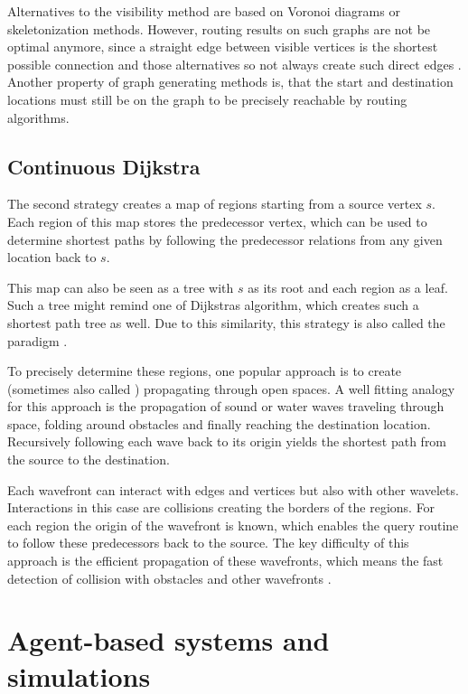 		Alternatives to the visibility method are based on Voronoi diagrams or skeletonization methods.
		However, routing results on such graphs are not be optimal anymore, since a straight edge between visible vertices is the shortest possible connection and those alternatives so not always create such direct edges \cite{graser-osm-open-spaces}.
		Another property of graph generating methods is, that the start and destination locations must still be on the graph to be precisely reachable by routing algorithms.
	
	\subsection{Continuous Dijkstra}
	\label{subsec:continuous-dijkstra}
	
		The second strategy creates a map of regions starting from a source vertex $s$.
		Each region of this map stores the predecessor vertex, which can be used to determine shortest paths by following the predecessor relations from any given location back to $s$.

		This map can also be seen as a tree with $s$ as its root and each region as a leaf.
		Such a tree might remind one of Dijkstras algorithm, which creates such a shortest path tree as well.
		Due to this similarity, this strategy is also called the  paradigm \cite{mitchell-discrete-geodesic}.
		
		To precisely determine these regions, one popular approach is to create  (sometimes also called ) propagating through open spaces.
		A well fitting analogy for this approach is the propagation of sound or water waves traveling through space, folding around obstacles and finally reaching the destination location.
		Recursively following each wave back to its origin yields the shortest path from the source to the destination.
		
		Each wavefront can interact with edges and vertices but also with other wavelets.
		Interactions in this case are collisions creating the borders of the regions.
		For each region the origin of the wavefront is known, which enables the query routine to follow these predecessors back to the source.
		The key difficulty of this approach is the efficient propagation of these wavefronts, which means the fast detection of collision with obstacles and other wavefronts \cite{hershberger-suri}.

\section{Agent-based systems and simulations}

